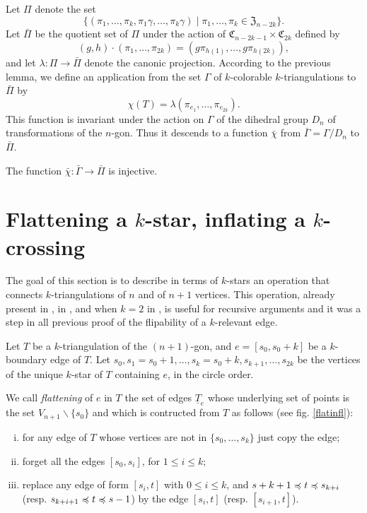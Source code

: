 \documentclass[12pt]{amsart}
\begin{document}
Let $\Pi$ denote the set
$$\{(\pi_1,\ldots,\pi_k,\pi_1\gamma,\ldots,\pi_k\gamma)\;|\;\pi_1,\ldots,\pi_k\in \mathfrak{Z}_{n-2k}\}.$$
Let $\bar{\Pi}$ be the quotient set of $\Pi$ under the action of $\mathfrak{C}_{n-2k-1}\times \mathfrak{C}_{2k}$ defined by
 $$(g,h)\cdot(\pi_1,\ldots,\pi_{2k})=(g\pi_{h(1)},\ldots,g\pi_{h(2k)}),$$
and let $\lambda:\Pi\to\bar{\Pi}$ denote the canonic projection. According to the previous lemma, we define an application from the set $\Gamma$ of $k$-colorable $k$-triangulations to $\bar{\Pi}$ by
$$\chi(T)=\lambda(\pi_{e_1},\ldots,\pi_{e_{2k}}).$$
This function is invariant under the action on $\Gamma$ of the dihedral group $D_n$ of transformations of the $n$-gon. Thus it descends to a function $\bar{\chi}$ from $\bar{\Gamma}=\Gamma/D_n$ to $\bar{\Pi}$. 

\begin{lemma}
The function $\bar{\chi}:\bar{\Gamma}\to\bar{\Pi}$ is injective.
\end{lemma}





\section{Flattening a $k$-star, inflating a $k$-crossing}\label{sectionflatinflat}

The goal of this section is to describe in terms of $k$-stars an operation that connects $k$-triangulations of $n$ and of $n+1$ vertices. This operation, already present in \cite{j-gt-03}, in \cite{n-gdfcp-00}, and when $k=2$ in \cite{e-btdp-06}, is useful for recursive arguments and it was a step in all previous proof of the flipability of a $k$-relevant edge.


\medskip
Let $T$ be a $k$-triangulation of the $(n+1)$-gon, and $e=[s_0,s_0+k]$ be a $k$-boundary edge of $T$.
Let $s_0,s_1=s_0+1,\ldots,s_k=s_0+k,s_{k+1},\ldots,s_{2k}$ be the vertices of the unique $k$-star of $T$ containing $e$, in the circle order.

We call \emph{flattening} of $e$ in $T$ the set of edges $\underline{T}_e$ whose underlying set of points is the set $V_{n+1}\smallsetminus\{s_0\}$ and which is contructed from $T$ as follows (see fig. \ref{flatinfl}):
\begin{enumerate}[(i)]
\item for any edge of $T$ whose vertices are not in $\{s_0,\ldots,s_k\}$ just copy the edge;
\item forget all the edges $[s_0,s_i]$, for $1\le i\le k$;
\item replace any edge of form $[s_i,t]$ with $0\le i\le k$, and $s+k+1\preccurlyeq t \preccurlyeq s_{k+i}$ (resp. $s_{k+i+1}\preccurlyeq t\preccurlyeq s-1$) by the edge $[s_i,t]$ (resp. $[s_{i+1},t]$).
\end{enumerate}
\end{document}
